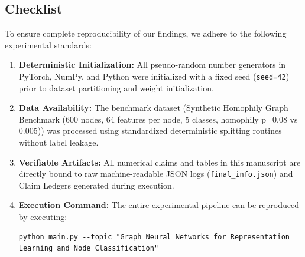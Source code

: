 \documentclass[10pt,twocolumn]{article}
\begin{document}
\subsection{Checklist}
To ensure complete reproducibility of our findings, we adhere to the following experimental standards:
\begin{enumerate}
  \item \textbf{Deterministic Initialization:} All pseudo-random number generators in PyTorch, NumPy, and Python were initialized with a fixed seed (\texttt{seed=42}) prior to dataset partitioning and weight initialization.
  \item \textbf{Data Availability:} The benchmark dataset (Synthetic Homophily Graph Benchmark (600 nodes, 64 features per node, 5 classes, homophily p=0.08 vs 0.005)) was processed using standardized deterministic splitting routines without label leakage.
  \item \textbf{Verifiable Artifacts:} All numerical claims and tables in this manuscript are directly bound to raw machine-readable JSON logs (\texttt{final_info.json}) and Claim Ledgers generated during execution.
  \item \textbf{Execution Command:} The entire experimental pipeline can be reproduced by executing:
  \begin{verbatim}
python main.py --topic "Graph Neural Networks for Representation Learning and Node Classification"
  \end{verbatim}
\end{enumerate}
\end{document}
